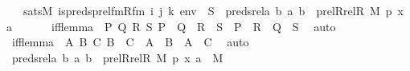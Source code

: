 \begin{isabellebody}
\ \ \ {\isachardoublequoteopen}sats{\isacharparenleft}{\kern0pt}M{\isacharcomma}{\kern0pt}\ is{\isacharunderscore}{\kern0pt}preds{\isacharunderscore}{\kern0pt}prel{\isacharunderscore}{\kern0pt}fm{\isacharparenleft}{\kern0pt}Rfm{\isacharcomma}{\kern0pt}\ i{\isacharcomma}{\kern0pt}\ j{\isacharcomma}{\kern0pt}\ k{\isacharparenright}{\kern0pt}{\isacharcomma}{\kern0pt}\ env{\isacharparenright}{\kern0pt}\ {\isasymlongleftrightarrow}\ S\ {\isacharequal}{\kern0pt}\ preds{\isacharunderscore}{\kern0pt}rel{\isacharparenleft}{\kern0pt}{\isasymlambda}a\ b{\isachardot}{\kern0pt}\ {\isacharless}{\kern0pt}a{\isacharcomma}{\kern0pt}\ b{\isachargreater}{\kern0pt}\ {\isasymin}\ prel{\isacharparenleft}{\kern0pt}Rrel{\isacharparenleft}{\kern0pt}R{\isacharcomma}{\kern0pt}\ M{\isacharparenright}{\kern0pt}{\isacharcomma}{\kern0pt}\ p{\isacharparenright}{\kern0pt}{\isacharcomma}{\kern0pt}\ {\isacharless}{\kern0pt}x{\isacharcomma}{\kern0pt}\ a{\isachargreater}{\kern0pt}{\isacharparenright}{\kern0pt}{\isachardoublequoteclose}\ \isanewline
%
\isadelimproof
%
\endisadelimproof
%
\isatagproof
{}\isamarkupfalse%
{\isacharminus}{\kern0pt}\ \isanewline
\ \ \isamarkupfalse%
\ iff{\isacharunderscore}{\kern0pt}lemma\ {\isacharcolon}{\kern0pt}\ {\isachardoublequoteopen}{\isasymAnd}P\ Q\ R\ S{\isachardot}{\kern0pt}\ {\isacharparenleft}{\kern0pt}P\ {\isasymlongleftrightarrow}\ Q{\isacharparenright}{\kern0pt}\ {\isasymLongrightarrow}\ {\isacharparenleft}{\kern0pt}R\ {\isasymlongleftrightarrow}\ S{\isacharparenright}{\kern0pt}\ {\isasymLongrightarrow}\ {\isacharparenleft}{\kern0pt}P\ {\isasymlongleftrightarrow}\ R{\isacharparenright}{\kern0pt}\ {\isasymlongleftrightarrow}\ {\isacharparenleft}{\kern0pt}Q\ {\isasymlongleftrightarrow}\ S{\isacharparenright}{\kern0pt}{\isachardoublequoteclose}\ \isamarkupfalse%
\ auto\isanewline
\ \ \isamarkupfalse%
\ iff{\isacharunderscore}{\kern0pt}lemma{}\ {\isacharcolon}{\kern0pt}\ {\isachardoublequoteopen}{\isasymAnd}A\ B\ C{\isachardot}{\kern0pt}\ B\ {\isacharequal}{\kern0pt}\ C\ {\isasymLongrightarrow}\ {\isacharparenleft}{\kern0pt}A\ {\isacharequal}{\kern0pt}\ B{\isacharparenright}{\kern0pt}\ {\isasymlongleftrightarrow}\ {\isacharparenleft}{\kern0pt}A\ {\isacharequal}{\kern0pt}\ C{\isacharparenright}{\kern0pt}{\isachardoublequoteclose}\ \isamarkupfalse%
\ auto\isanewline
\isanewline
\ \ \isamarkupfalse%
\ {\isachardoublequoteopen}preds{\isacharunderscore}{\kern0pt}rel{\isacharparenleft}{\kern0pt}{\isasymlambda}a\ b{\isachardot}{\kern0pt}\ {\isasymlangle}a{\isacharcomma}{\kern0pt}\ b{\isasymrangle}\ {\isasymin}\ prel{\isacharparenleft}{\kern0pt}Rrel{\isacharparenleft}{\kern0pt}R{\isacharcomma}{\kern0pt}\ M{\isacharparenright}{\kern0pt}{\isacharcomma}{\kern0pt}\ p{\isacharparenright}{\kern0pt}{\isacharcomma}{\kern0pt}\ {\isasymlangle}x{\isacharcomma}{\kern0pt}\ a{\isasymrangle}{\isacharparenright}{\kern0pt}\ {\isasymin}\ M{\isachardoublequoteclose}\isanewline

\end{isabellebody}
